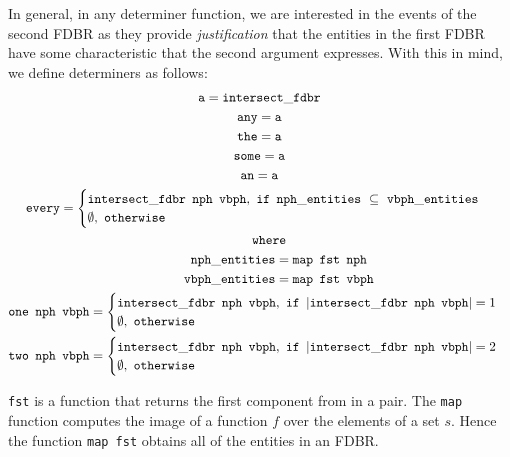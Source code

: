 \documentclass[../main.tex]{subfiles}
\begin{document}
In general, in any determiner function, we are interested in the events of the second FDBR as they provide {\em justification} that the entities in the first FDBR
have some characteristic that the second argument expresses.  With this in mind, we define determiners as follows:\\
{\setlength{\mathindent}{0cm}
\allowdisplaybreaks
\begin{gather*}
\mathtt{a} = \mathtt{intersect\_fdbr} \\
\mathtt{any} = \mathtt{a} \\
\mathtt{the} = \mathtt{a}  \\
\mathtt{some} = \mathtt{a}   \\
\mathtt{an} = \mathtt{a}   \\
\mathtt{every} =
\begin{cases}
	\mathtt{intersect\_fdbr}\enspace \mathtt{nph}\enspace \mathtt{vbph},\ \mathtt{if}\enspace \mathtt{nph\_entities}\ \subseteq\ \mathtt{vbph\_entities} \\
	\mathtt{\emptyset},\ \mathtt{otherwise}
\end{cases} \\
\mathtt{\indent where} \\
\mathtt{\indent\indent nph\_entities} = \mathtt{map}\enspace \mathtt{fst}\enspace \mathtt{nph} \\
\mathtt{\indent\indent vbph\_entities} = \mathtt{map}\enspace \mathtt{fst}\enspace \mathtt{vbph} \\
\mathtt{one}\enspace \mathtt{nph}\enspace \mathtt{vbph} =
\begin{cases}
	\mathtt{intersect\_fdbr}\enspace \mathtt{nph}\enspace \mathtt{vbph},\ \mathtt{if}\ \left\vert\mathtt{intersect\_fdbr}\enspace \mathtt{nph}\enspace \mathtt{vbph}\right\vert = 1 \\
	\emptyset,\ \mathtt{otherwise}
\end{cases} \\
\mathtt{two}\enspace \mathtt{nph}\enspace \mathtt{vbph} =
\begin{cases}
\mathtt{intersect\_fdbr}\enspace \mathtt{nph}\enspace \mathtt{vbph},\ \mathtt{if}\ \left\vert\mathtt{intersect\_fdbr}\enspace \mathtt{nph}\enspace \mathtt{vbph}\right\vert = 2 \\
\emptyset,\ \mathtt{otherwise}
\end{cases} \\
\end{gather*}
}

\texttt{fst} is a function that returns the first component from in a pair.  The \texttt{map} function computes the image of a function $f$ over the elements of a set $s$.  
Hence the function \texttt{map fst} obtains all of the entities in an FDBR.
\end{document}
